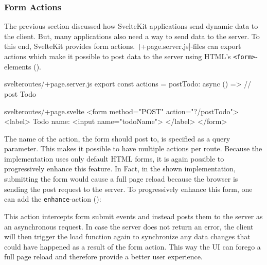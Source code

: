 \subsubsection{Form Actions}
\label{sec:sveltekit-form-actions}

The previous section discussed how SvelteKit applications send dynamic data to the client. But, many applications also need a way to send data to the server. To this end, SvelteKit provides form actions. \texttt|+page.server.js|-files can export actions which make it possible to post data to the server using HTML's \texttt{<form>}-elements ().

\begin{listing}[h!]
\begin{myminted}{svelte}{routes/+page.server.js}
export const actions = {
  postTodo: async () => {
    // post Todo
  }
}
\end{myminted}
\begin{myminted}{svelte}{routes/+page.svelte}
<form method="POST" action="?/postTodo">
  <label>
    Todo name:
    <input name="todoName">
  </label>
</form>
\end{myminted}
\caption{Example server action to post a new to-do.}
\label{fig:sveltekit-server-action}
\end{listing}

The name of the action, the form should post to, is specified as a query parameter. This makes it possible to have multiple actions per route. Because the implementation uses only default HTML forms, it is again possible to progressively enhance this feature. In Fact, in the shown implementation, submitting the form would cause a full page reload because the browser is sending the post request to the server. To progressively enhance this form, one can add the \texttt{enhance}-action ():

\begin{listing}[h!]
\s{$}
\caption{Progressively enhanced form that will handle submits without a full page reload.}
\label{fig:sveltekit-form-action-enhance}
\end{listing}

This action intercepts form submit events and instead posts them to the server as an asynchronous request. In case the server does not return an error, the client will then trigger the load function again to synchronize any data changes that could have happened as a result of the form action. This way the UI can forego a full page reload and therefore provide a better user experience.

